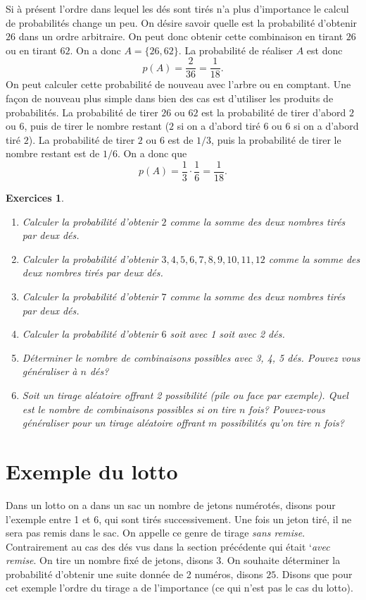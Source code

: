 \documentclass[a4paper,12pt]{book}
\newtheorem*{exercices}{Exercices}
\begin{document}
Si à présent l'ordre dans lequel les dés sont tirés n'a plus d'importance le calcul de probabilités change un peu.
On désire savoir quelle est la probabilité d'obtenir $26$ dans un ordre arbitraire. On peut donc obtenir
cette combinaison en tirant $26$ ou en tirant $62$. On a donc $A=\{26,62\}$. La probabilité de réaliser $A$
est donc
\begin{equation}
 p(A)=\frac{2}{36}=\frac{1}{18}.
\end{equation}
On peut calculer cette probabilité de nouveau avec l'arbre ou en comptant. Une façon de nouveau plus simple
dans bien des cas est d'utiliser les produits de probabilités. La probabilité de tirer
$26$ ou $62$ est la probabilité de tirer d'abord $2$ ou $6$, puis de tirer le nombre restant ($2$ si on a d'abord tiré $6$
ou $6$ si on a d'abord tiré $2$). La probabilité de tirer $2$ ou $6$ est de $1/3$, puis la probabilité de tirer
le nombre restant est de $1/6$. On a donc que
\begin{equation}
 p(A)=\frac{1}{3}\cdot \frac{1}{6}=\frac{1}{18}.
\end{equation}

\begin{exercices}
\hfill\break
 \begin{enumerate}
  \item Calculer la probabilité d'obtenir $2$ comme la somme des deux nombres tirés par deux dés.
  \item Calculer la probabilité d'obtenir $3,4,5,6,7,8,9,10,11,12$ comme la somme des deux nombres tirés par deux dés.
  \item Calculer la probabilité d'obtenir $7$ comme la somme des deux nombres tirés par deux dés.
  \item Calculer la probabilité d'obtenir $6$ soit avec 1 soit avec 2 dés.
  \item Déterminer le nombre de combinaisons possibles avec 3, 4, 5 dés. Pouvez vous généraliser à $n$ dés?
  \item Soit un tirage aléatoire offrant 2 possibilité (pile ou face par exemple). Quel est le nombre de combinaisons possibles 
  si on tire $n$ fois? Pouvez-vous généraliser pour un tirage aléatoire offrant $m$ possibilités qu'on tire $n$ fois?
 \end{enumerate}

\end{exercices}

\section{Exemple du lotto}
Dans un lotto on a dans un sac un nombre de jetons numérotés, disons pour l'exemple entre 1 et 6, 
qui sont tirés successivement. Une fois un jeton tiré, il ne sera pas remis dans le sac. 
On appelle ce genre de tirage \textit{sans remise}. Contrairement au cas des dés vus dans 
la section précédente qui était `\textit{avec remise}.
On tire un nombre fixé de jetons, disons 3. On souhaite déterminer la probabilité d'obtenir
une suite donnée de 2 numéros, disons $25$. Disons que pour cet exemple l'ordre du tirage a de l'importance
(ce qui n'est pas le cas du lotto).
\end{document}
